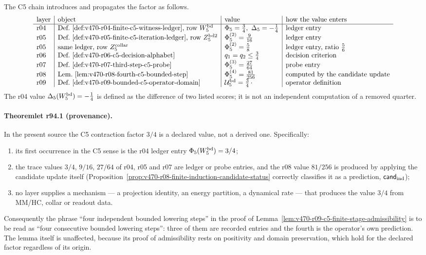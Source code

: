 The C5 chain introduces and propagates the factor as follows.
\[
\begin{array}{l|l|l|l}
\text{layer} & \text{object} & \text{value} & \text{how the value enters}\\
\hline
\text{r04} & \text{Def.~\ref{def:v470-r04-finite-c5-witness-ledger}, row }W_5^{\rm bd}
 & \Phi_5=\tfrac34,\ \Delta_5=-\tfrac14 & \text{ledger entry}\\
\text{r05} & \text{Def.~\ref{def:v470-r05-finite-c5-iteration-ledger}, row }Z_5^{\rm bd2}
 & \Phi_5^{(2)}=\tfrac9{16} & \text{ledger entry}\\
\text{r05} & \text{same ledger, row }Z_5^{\rm collar}
 & \Phi_5^{(2)}=\tfrac58 & \text{ledger entry, ratio }\tfrac56\\
\text{r06} & \text{Def.~\ref{def:v470-r06-c5-decision-alphabet}}
 & q_1=q_2\le\tfrac34 & \text{decision criterion}\\
\text{r07} & \text{Def.~\ref{def:v470-r07-third-step-c5-probe}}
 & \Phi_5^{(3)}=\tfrac{27}{64} & \text{probe entry}\\
\text{r08} & \text{Lem.~\ref{lem:v470-r08-fourth-c5-bounded-step}}
 & \Phi_5^{(4)}=\tfrac{81}{256} & \text{computed by the candidate update}\\
\text{r09} & \text{Def.~\ref{def:v470-r09-bounded-c5-operator-domain}}
 & \mathcal U_5^{\rm bd}=\tfrac34\,\cdot & \text{operator definition}
\end{array}
\]
The r04 value \(\Delta_5(W_5^{\rm bd})=-\tfrac14\) is defined as the difference of two listed
scores; it is not an independent computation of a removed quarter.

\paragraph{Theoremlet r94.1 (provenance).}
In the present source the C5 contraction factor \(3/4\) is a declared value, not a derived
one.  Specifically:
\begin{enumerate}[leftmargin=2em]
 \item its first occurrence in the C5 sense is the r04 ledger entry \(\Phi_5(W_5^{\rm bd})=3/4\);
 \item the trace values \(3/4\), \(9/16\), \(27/64\) of r04, r05 and r07 are ledger or probe
 entries, and the r08 value \(81/256\) is produced by applying the candidate update itself
 (Proposition~\ref{prop:v470-r08-finite-induction-candidate-status} correctly classifies it as a
 prediction, \(\mathsf{cand}_{\rm ind}\));
 \item no layer supplies a mechanism --- a projection identity, an energy partition, a dynamical
 rate --- that produces the value \(3/4\) from MM/HC, collar or readout data.
\end{enumerate}
Consequently the phrase ``four independent bounded lowering steps'' in the proof of
Lemma~\ref{lem:v470-r09-c5-finite-stage-admissibility} is to be read as ``four consecutive
bounded lowering steps'': three of them are recorded entries and the fourth is the operator's
own prediction.  The lemma itself is unaffected, because its proof of admissibility rests on
positivity and domain preservation, which hold for the declared factor regardless of its
origin.

